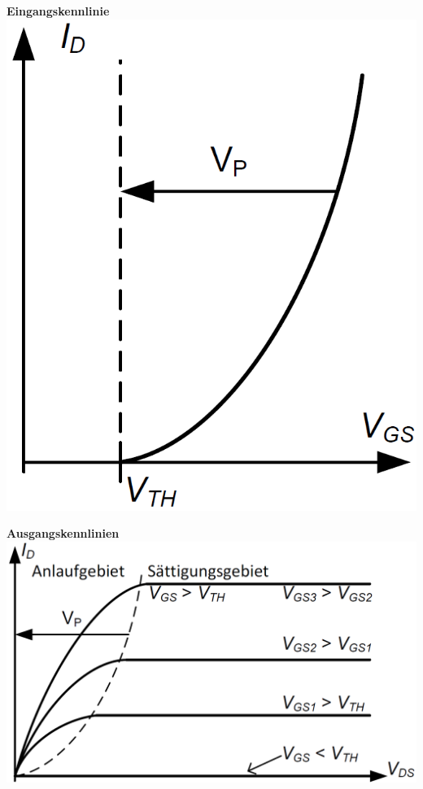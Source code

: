 \begin{minipage}[t]{0.3\columnwidth}
    \textbf{Eingangskennlinie} \\
    \includegraphics[align=c, width=\columnwidth]{images/mos_fet_eingangskennlinie.png}
\end{minipage}
\hfill
\begin{minipage}[t]{0.6\columnwidth}
    \textbf{Ausgangskennlinien} \\
    \includegraphics[align=c, width=\columnwidth]{images/mos_fet_ausgangskennlinien.png}
\end{minipage}


